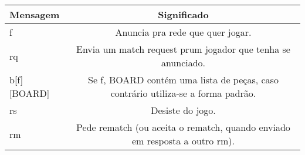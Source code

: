 \documentclass[12pt]{article}
\begin{document}
\begin{table}[h!]
  \begin{center}
    \begin{tabular}{l|c}
      \textbf{Mensagem} & \textbf{Significado}\\
      \hline
      f  & Anuncia pra rede que quer jogar.\\
      rq & Envia um match request prum jogador que tenha se anunciado.\\
      b[f][BOARD] & Se f, BOARD contém uma lista de peças, caso contrário utiliza-se a forma padrão.\\
      rs & Desiste do jogo.\\
      rm & Pede rematch (ou aceita o rematch, quando enviado em resposta a outro rm).\\
    \end{tabular}
  \end{center}
\end{table}

      


\end{document}
